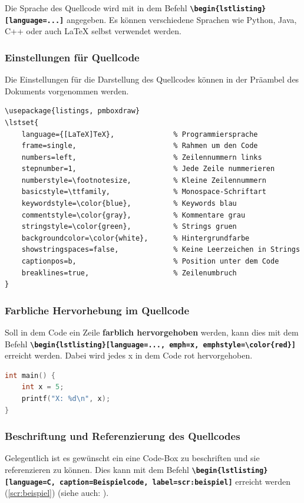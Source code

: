 Die Sprache des Quellcode wird mit in dem Befehl \textbf{\texttt{\textbackslash begin\{lstlisting\}[language=...]}} angegeben. Es können verschiedene Sprachen wie Python, Java, C++ oder auch \LaTeX{} selbst verwendet werden.

\subsubsection{Einstellungen für Quellcode}
Die Einstellungen für die Darstellung des Quellcodes können in der Präambel des Dokuments vorgenommen werden.

\begin{lstlisting}[language={[LaTeX]TeX}]
\usepackage{listings, pmboxdraw}
\lstset{
    language={[LaTeX]TeX},              % Programmiersprache
    frame=single,                       % Rahmen um den Code
    numbers=left,                       % Zeilennummern links
    stepnumber=1,                       % Jede Zeile nummerieren
    numberstyle=\footnotesize,          % Kleine Zeilennummern
    basicstyle=\ttfamily,               % Monospace-Schriftart
    keywordstyle=\color{blue},          % Keywords blau
    commentstyle=\color{gray},          % Kommentare grau
    stringstyle=\color{green},          % Strings gruen
    backgroundcolor=\color{white},      % Hintergrundfarbe
    showstringspaces=false,             % Keine Leerzeichen in Strings
    captionpos=b,                       % Position unter dem Code 
    breaklines=true,                    % Zeilenumbruch
}
\end{lstlisting}

\subsubsection{Farbliche Hervorhebung im Quellcode}
Soll in dem Code ein Zeile \textbf{farblich hervorgehoben} werden, kann dies mit dem Befehl \textbf{\texttt{\textbackslash begin\{lstlisting\}[language=..., emph={x}, emphstyle=\textbackslash color\{red\}]}} erreicht werden. Dabei wird jedes x in dem Code rot hervorgehoben.

\begin{lstlisting}[language=C, emph={x}, emphstyle=\color{red}]
int main() {
    int x = 5;
    printf("X: %d\n", x);
}
\end{lstlisting}

\subsubsection{Beschriftung und Referenzierung des Quellcodes}
Gelegentlich ist es gewünscht ein eine Code-Box zu beschriften und sie referenzieren zu können. Dies kann mit dem Befehl \textbf{\texttt{\textbackslash begin\{lstlisting\}[language=C, caption=Beispielcode, label=scr:beispiel]}} erreicht werden (\autoref{scr:beispiel}) (siehe auch: ).

